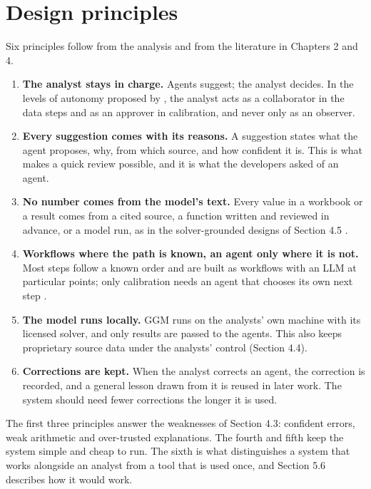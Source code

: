 \section{Design principles}

Six principles follow from the analysis and from the literature in Chapters 2 and 4.

\begin{enumerate}
  \item \textbf{The analyst stays in charge.} Agents suggest; the analyst decides. In the levels of autonomy proposed by \citet{feng2025levels}, the analyst acts as a collaborator in the data steps and as an approver in calibration, and never only as an observer.
  \item \textbf{Every suggestion comes with its reasons.} A suggestion states what the agent proposes, why, from which source, and how confident it is. This is what makes a quick review possible, and it is what the developers asked of an agent.
  \item \textbf{No number comes from the model's text.} Every value in a workbook or a result comes from a cited source, a function written and reviewed in advance, or a model run, as in the solver-grounded designs of Section 4.5 \citep{rojas2026llms, hu2025natural}.
  \item \textbf{Workflows where the path is known, an agent only where it is not.} Most steps follow a known order and are built as workflows with an LLM at particular points; only calibration needs an agent that chooses its own next step \citep{schluntz2024building}.
  \item \textbf{The model runs locally.} GGM runs on the analysts' own machine with its licensed solver, and only results are passed to the agents. This also keeps proprietary source data under the analysts' control (Section 4.4).
  \item \textbf{Corrections are kept.} When the analyst corrects an agent, the correction is recorded, and a general lesson drawn from it is reused in later work. The system should need fewer corrections the longer it is used.
\end{enumerate}

The first three principles answer the weaknesses of Section 4.3: confident errors, weak arithmetic and over-trusted explanations.
The fourth and fifth keep the system simple and cheap to run.
The sixth is what distinguishes a system that works alongside an analyst from a tool that is used once, and Section 5.6 describes how it would work.
